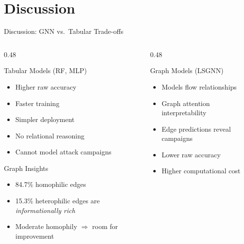 \documentclass[aspectratio=169, 10pt]{beamer}
\begin{document}
\section{Discussion}

\begin{frame}{Discussion: GNN vs.\ Tabular Trade-offs}
\begin{columns}[T]
\begin{column}{0.48\textwidth}
\begin{block}{Tabular Models (RF, MLP)}
\begin{itemize}
    \item[\color{accentgreen}\checkmark] Higher raw accuracy
    \item[\color{accentgreen}\checkmark] Faster training
    \item[\color{accentgreen}\checkmark] Simpler deployment
    \item[$\times$] No relational reasoning
    \item[$\times$] Cannot model attack campaigns
\end{itemize}
\end{block}
\vspace{0.2cm}
\begin{block}{Graph Insights}
\begin{itemize}
    \item 84.7\% homophilic edges
    \item 15.3\% heterophilic edges are \textit{informationally rich}
    \item Moderate homophily $\Rightarrow$ room for improvement
\end{itemize}
\end{block}
\end{column}
\begin{column}{0.48\textwidth}
\begin{block}{Graph Models (LSGNN)}
\begin{itemize}
    \item[\color{accentgreen}\checkmark] Models flow relationships
    \item[\color{accentgreen}\checkmark] Graph attention interpretability
    \item[\color{accentgreen}\checkmark] Edge predictions reveal campaigns
    \item[$\times$] Lower raw accuracy
    \item[$\times$] Higher computational cost

\end{itemize}
\end{block}
\end{column}
\end{columns}
\end{frame}
\end{document}
